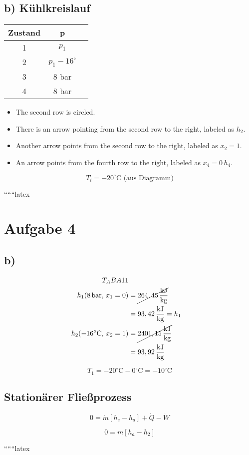 \subsection*{b) Kühlkreislauf}

\begin{tabular}{|c|c|c|}
    \hline
    Zustand & p & \\
    \hline
    1 & $p_1$ & \\
    \hline
    2 & $p_1 - 16^\circ$ & \\
    \hline
    3 & 8 bar & \\
    \hline
    4 & 8 bar & \\
    \hline
\end{tabular}

\begin{itemize}
    \item The second row is circled.
    \item There is an arrow pointing from the second row to the right, labeled as \( h_2 \).
    \item Another arrow points from the second row to the right, labeled as \( x_2 = 1 \).
    \item An arrow points from the fourth row to the right, labeled as \( x_4 = 0 \, h_4 \).
\end{itemize}

\[
T_i = -20^\circ \text{C (aus Diagramm)}
\]

``````latex

\section*{Aufgabe 4}



\subsection*{b)}

\begin{align*}
    T_A B A 11 \\
    h_1 (8 \, \text{bar}, \, x_1 = 0) &= \cancel{264,45 \, \frac{\text{kJ}}{\text{kg}}} \\
    &= 93,42 \, \frac{\text{kJ}}{\text{kg}} = h_1 \\
    h_2 (-16^\circ \text{C}, \, x_2 = 1) &= \cancel{2401,15 \, \frac{\text{kJ}}{\text{kg}}} \\
    &= 93,92 \, \frac{\text{kJ}}{\text{kg}}
\end{align*}

\[
T_1 = -20^\circ \text{C} - 0^\circ \text{C} = -10^\circ \text{C}
\]

\subsection*{Stationärer Fließprozess}

\[
0 = \dot{m} \left[ h_e - h_a \right] + \dot{Q} - \dot{W}
\]

\[
0 = m \left[ h_a - h_2 \right]
\]

``````latex